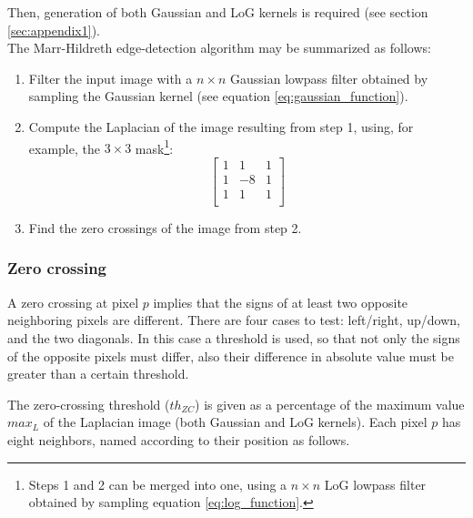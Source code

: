 \documentclass{ipol}
\numberwithin{equation}{section}
\numberwithin{table}{section}
\begin{document}
Then, generation of both Gaussian and LoG kernels is required (see section \ref{sec:appendix1}).\\

The Marr-Hildreth edge-detection algorithm may be summarized as follows:
\begin{enumerate}
	\item Filter the input image with a $n \times n$ Gaussian lowpass filter obtained by sampling the Gaussian kernel (see equation \ref{eq:gaussian_function}). %
	\item Compute the Laplacian of the image resulting from step 1, using, for example, the $3\times3$ mask\footnote{Steps 1 and 2 can be merged into one, using a $n\times n$ LoG lowpass filter obtained by sampling equation \ref{eq:log_function}.}:
	\begin{equation*}
		\begin{bmatrix}
			1 &  1 & 1 \\
			1 & -8 & 1 \\
			1 &  1 & 1 \\
		\end{bmatrix}
	\end{equation*}
	\item Find the zero crossings of the image from step 2.
\end{enumerate}



\subsubsection{Zero crossing}


A zero crossing at pixel $p$ implies that the signs of at least two opposite neighboring pixels are 
different. There are four cases to test: left/right, up/down, and the two diagonals. In this case 
a threshold is used, so that not only the signs of the opposite pixels must differ, also their 
difference in absolute value must be greater than a certain threshold. 

The zero-crossing threshold ($th_{ZC}$) is given as a percentage of the maximum value $max_L$ of the Laplacian 
image (both Gaussian and LoG kernels). Each pixel $p$ has eight neighbors, named according to their position 
as follows.
\end{document}

